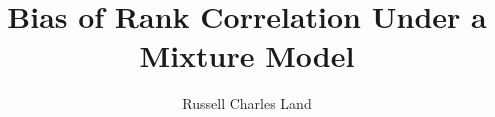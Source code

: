 \documentclass[12pt,oneside]{report}
\title{Bias of Rank Correlation Under a Mixture Model}
\author{Russell Charles Land}
\begin{document}
  
  \titlep
  \copyrightpage
  \approvalpage
  
  \tableofcontents
  
  
  
  
  
  
\end{document}
